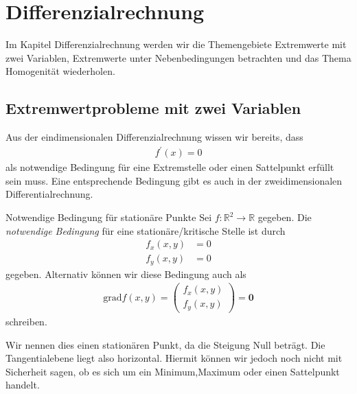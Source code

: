 \section{Differenzialrechnung}
Im Kapitel Differenzialrechnung werden wir die Themengebiete Extremwerte mit zwei Variablen, Extremwerte unter Nebenbedingungen betrachten und das Thema Homogenität wiederholen.
\subsection{Extremwertprobleme mit zwei Variablen}
Aus der eindimensionalen Differenzialrechnung wissen wir bereits,
dass
\begin{align*}
f^\prime(x) = 0
\end{align*}
als notwendige Bedingung für eine Extremstelle oder einen Sattelpunkt erfüllt sein muss.
Eine entsprechende Bedingung gibt es auch in der zweidimensionalen Differentialrechnung.\\
\begin{mybox}{Notwendige Bedingung für stationäre Punkte}
Sei $f : \mathbb{R}^2 \to \mathbb{R}$ gegeben. 
Die \textit{notwendige Bedingung} für eine stationäre/kritische Stelle ist durch
\begin{align*}
f_x(x,y) &= 0\\
f_y(x,y) &= 0
\end{align*}
gegeben.
Alternativ können wir diese Bedingung auch als
\begin{align*}
\mathrm{grad} f (x,y) 
= 
\begin{pmatrix}
f_x(x,y)\\
f_y(x,y) 
\end{pmatrix}
= 
\textbf{0}
\end{align*}
schreiben.
\end{mybox}
Wir nennen dies einen stationären Punkt, da die Steigung Null beträgt.
Die Tangentialebene liegt also horizontal.
Hiermit können wir jedoch noch nicht mit Sicherheit sagen, ob es sich um ein Minimum,Maximum oder einen Sattelpunkt handelt.\\
